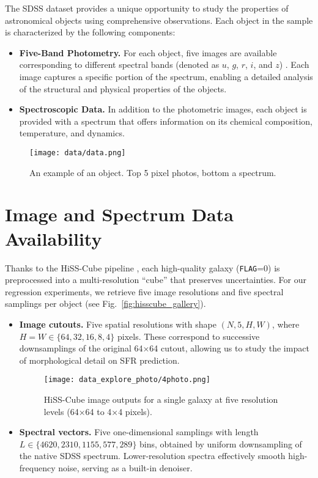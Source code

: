 \documentclass[english,bachelor,oneside]{ctufit-thesis}
\begin{document}
The SDSS dataset provides a unique opportunity to study the properties of astronomical objects using comprehensive observations. Each object in the sample is characterized by the following components:
\begin{itemize}
    \item \textbf{Five-Band Photometry.} For each object, five images are available corresponding to different spectral bands (denoted as \(u\), \(g\), \(r\), \(i\), and \(z\)) \cite{fukugita1996sloan}. Each image captures a specific portion of the spectrum, enabling a detailed analysis of the structural and physical properties of the objects.
    \item \textbf{Spectroscopic Data.} In addition to the photometric images, each object is provided with a spectrum that offers information on its chemical composition, temperature, and dynamics.
\end{itemize}

\begin{figure}[h]
    \centering
    \texttt{[image: data/data.png]}
    \caption{An example of an object. Top 5 pixel photos, bottom a spectrum.}
    \label{fig:prism}
\end{figure}

\section{Image and Spectrum Data Availability}  
Thanks to the HiSS-Cube pipeline \cite{nadvornik2021hiss}, each high-quality galaxy (\texttt{FLAG}=0) is preprocessed into a multi-resolution “cube” that preserves uncertainties. For our regression experiments, we retrieve five image resolutions and five spectral samplings per object (see Fig.~\ref{fig:hisscube_gallery}).



\begin{itemize}
  \item \textbf{Image cutouts.} Five spatial resolutions with shape $(N,5,H,W)$, where $H=W\in\{64,32,16,8,4\}$ pixels.  
    These correspond to successive downsamplings of the original 64×64 cutout, allowing us to study the impact of morphological detail on SFR prediction.
\begin{figure}[H]
  \centering
  \texttt{[image: data\_explore\_photo/4photo.png]}
  \caption{HiSS-Cube image outputs for a single galaxy at five resolution levels (64×64 to 4×4 pixels).}
  \label{fig:hisscube_images}
\end{figure}
  \item \textbf{Spectral vectors.} Five one-dimensional samplings with length 
  $L\in\{4620,2310,1155,577,289\}$ bins,  
    obtained by uniform downsampling of the native SDSS spectrum. Lower-resolution spectra effectively smooth high-frequency noise, serving as a built-in denoiser.
\end{itemize}
\end{document}
